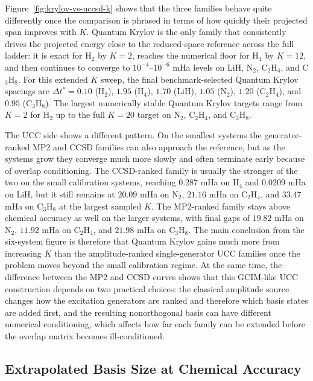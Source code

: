 Figure~\ref{fig:krylov-vs-uccsd-k} shows that the three families behave quite differently once the comparison is phrased in terms of how quickly their projected span improves with $K$. Quantum Krylov is the only family that consistently drives the projected energy close to the reduced-space reference across the full ladder: it is exact for H$_2$ by $K=2$, reaches the numerical floor for H$_4$ by $K=12$, and then continues to converge to $10^{-4}$--$10^{-6}$ mHa levels on LiH, N$_2$, C$_2$H$_4$, and C$_3$H$_8$. For this extended $K$ sweep, the final benchmark-selected Quantum Krylov spacings are $\Delta t^*=0.10$ (H$_2$), $1.95$ (H$_4$), $1.70$ (LiH), $1.05$ (N$_2$), $1.20$ (C$_2$H$_4$), and $0.95$ (C$_3$H$_8$). The largest numerically stable Quantum Krylov targets range from $K=2$ for H$_2$ up to the full $K=20$ target on N$_2$, C$_2$H$_4$, and C$_3$H$_8$.

The UCC side shows a different pattern. On the smallest systems the generator-ranked MP2 and CCSD families can also approach the reference, but as the systems grow they converge much more slowly and often terminate early because of overlap conditioning. The CCSD-ranked family is usually the stronger of the two on the small calibration systems, reaching $0.287$ mHa on H$_4$ and $0.0209$ mHa on LiH, but it still remains at $20.09$ mHa on N$_2$, $21.16$ mHa on C$_2$H$_4$, and $33.47$ mHa on C$_3$H$_8$ at the largest sampled $K$. The MP2-ranked family stays above chemical accuracy as well on the larger systems, with final gaps of $19.82$ mHa on N$_2$, $11.92$ mHa on C$_2$H$_4$, and $21.98$ mHa on C$_3$H$_8$. The main conclusion from the six-system figure is therefore that Quantum Krylov gains much more from increasing $K$ than the amplitude-ranked single-generator UCC families once the problem moves beyond the small calibration regime. At the same time, the difference between the MP2 and CCSD curves shows that this GCIM-like UCC construction depends on two practical choices: the classical amplitude source changes how the excitation generators are ranked and therefore which basis states are added first, and the resulting nonorthogonal basis can have different numerical conditioning, which affects how far each family can be extended before the overlap matrix becomes ill-conditioned.

\subsection{Extrapolated Basis Size at Chemical Accuracy}

